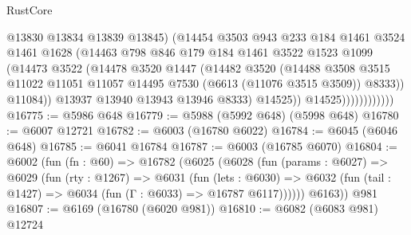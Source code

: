 \begin{lexlean}{RustCore}
\begin{coremodule}
                                @13830
                                @13834
                                @13839
                                @13845)
                              (@14454
                                @3503
                                @943
                                @233
                                @184
                                @1461
                                @3524
                                @1461
                                @1628
                                (@14463
                                  @798
                                  @846
                                  @179
                                  @184
                                  @1461
                                  @3522
                                  @1523
                                  @1099
                                  (@14473
                                    @3522
                                    (@14478
                                      @3520
                                      @1447
                                      (@14482
                                        @3520
                                        (@14488
                                          @3508
                                          @3515
                                          @11022
                                          @11051
                                          @11057
                                          @14495
                                          @7530
                                          (@6613 (@11076 @3515 @3509))
                                          @8333))
                                      @11084))
                                  @13937
                                  @13940
                                  @13943
                                  @13946
                                  @8333)
                                @14525))
                            @14525))))))))))))
@16775 := @5986 @648
@16779 := @5988 (@5992 @648) (@5998 @648)
@16780 := @6007 @12721
@16782 := @6003 (@16780 @6022)
@16784 := @6045 (@6046 @648)
@16785 := @6041 @16784
@16787 := @6003 (@16785 @6070)
@16804 := @6002
    (fun (fn : @60) =>
    @16782
      (@6025
        (@6028
          (fun (params : @6027) =>
          @6029
            (fun (rty : @1267) =>
            @6031
              (fun (lets : @6030) =>
              @6032 (fun (tail : @1427) => @6034 (fun (Γ : @6033) => @16787 @6117))))))
        @6163))
    @981
@16807 := @6169 (@16780 (@6020 @981))
@16810 := @6082 (@6083 @981) @12724

\end{coremodule}
\end{lexlean}
